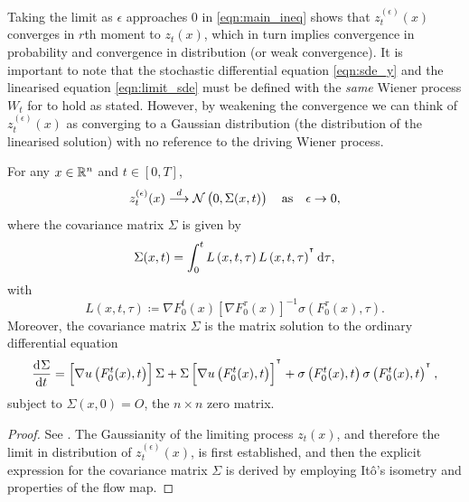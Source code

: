 Taking the limit as \(\epsilon\) approaches 0 in \eqref{eqn:main_ineq} shows that \(z_t^{(\epsilon)}(x)\) converges in \(r\)th moment to \(z_t(x)\), which in turn implies convergence in probability and convergence in distribution (or weak convergence).
It is important to note that the stochastic differential equation \eqref{eqn:sde_y} and the linearised equation \eqref{eqn:limit_sde} must be defined with the \emph{same} Wiener process \(W_t\) for  to hold as stated.
However, by weakening the convergence we can think of \(z_t^{(\epsilon)}(x)\) as converging to a Gaussian distribution (the distribution of the linearised solution) with no reference to the driving Wiener process.

\begin{theorem}\label{thm:gauss_dist}
	For any \(x \in \mathbb{R}^n\) and \(t \in [0,T]\),
	\[
		z_t^{(\epsilon)}(x)  \stackrel{d}{\longrightarrow} \mathcal{N}\left(0, \Sigma(x,t)\right) \quad \text{as} \quad \epsilon \to 0,
	\]
	where the covariance matrix \(\Sigma\) is given by
	\begin{equation}
		\Sigma(x,t) = \int_0^t{L\left(x, t, \tau\right)L\left(x, t, \tau\right)^{\T}\dif\tau},
		\label{eqn:sigma_calc}
	\end{equation}
	with
	\begin{equation}
		L\left(x, t, \tau\right) \coloneqq \nabla F_0^t(x) \left[\nabla F_0^\tau(x)\right]^{-1}\sigma\left(F_0^\tau(x), \tau\right).
		\label{eqn:sigma_L_def}
	\end{equation}
	Moreover, the covariance matrix \(\Sigma\) is the matrix solution to the ordinary differential equation
	\begin{equation}
		\dod{\Sigma}{t} = \left[\nabla u\left(F_0^t(x), t\right)\right]\Sigma + \Sigma\left[\nabla u\left(F_0^t(x), t\right)\right]^{\T} + \sigma\left(F_0^t(x), t\right)\sigma\left(F_0^t(x), t\right)^{\T},
		\label{eqn:sigma_ode}
	\end{equation}
	subject to \(\Sigma(x,0) = O\), the \(n \times n\) zero matrix.
\end{theorem}
\begin{proof}
	See .
	The Gaussianity of the limiting process \(z_t(x)\), and therefore the limit in distribution of \(z_t^{(\epsilon)}(x)\), is first established, and then the explicit expression for the covariance matrix \(\Sigma\) is derived by employing It\^o's isometry and properties of the flow map.
\end{proof}


